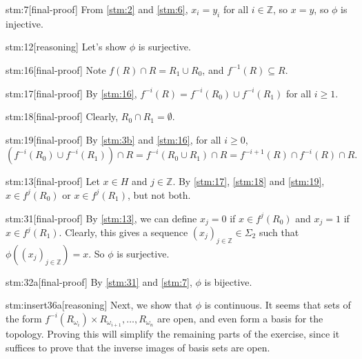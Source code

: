 \begin{stm}{stm:7}[final-proof]
From \ref{stm:2} and \ref{stm:6}, $x_i = y_i$ for all $i \in \mathbb{Z}$, so $x = y$, so $\phi$ is injective.
\end{stm}

\begin{stm}{stm:12}[reasoning]
Let's show $\phi$ is surjective.
\end{stm}

\begin{stm}{stm:16}[final-proof]
Note $f(R) \cap R = R_1 \cup R_0$, and $f^{-1}(R) \subseteq R$.
\end{stm}

\begin{stm}{stm:17}[final-proof]
By \ref{stm:16}, $f^{-i}(R) = f^{-i}(R_0) \cup f^{-i}(R_1)$ for all $i \geq 1$.
\end{stm}

\begin{stm}{stm:18}[final-proof]
Clearly, $R_0 \cap R_1 = \emptyset$.
\end{stm}

\begin{stm}{stm:19}[final-proof]
By \ref{stm:3b} and \ref{stm:16}, for all $i \ge 0$,
\[
\left(f^{-i}(R_0) \cup f^{-i}(R_1)\right) \cap R = f^{-i}(R_0 \cup R_1) \cap R = f^{-i+1}(R) \cap f^{-i}(R) \cap R.
\]
\end{stm}

\begin{stm}{stm:13}[final-proof]
Let $x \in H$ and $j \in \mathbb{Z}$. By \ref{stm:17}, \ref{stm:18} and \ref{stm:19}, $x \in f^j(R_0)$ or $x \in f^j(R_1)$, but not both.
\end{stm}

\begin{stm}{stm:31}[final-proof]
By \ref{stm:13}, we can define $x_j = 0$ if $x \in f^j(R_0)$ and $x_j = 1$ if $x \in f^j(R_1)$.  Clearly, this gives a sequence $(x_j)_{j \in \mathbb{Z}} \in \Sigma_2$ such that $\phi((x_j)_{j \in \mathbb{Z}}) = x$.
So $\phi$ is surjective.
\end{stm}

\begin{stm}{stm:32a}[final-proof]
By \ref{stm:31} and \ref{stm:7}, $\phi$ is bijective.
\end{stm}

\begin{stm}{stm:insert36a}[reasoning]
Next, we show that $\phi$ is continuous. It seems that sets of the form $f^{-i}(R_{\omega_i}) \times R_{\omega_{i+1}}, \ldots, R_{\omega_n}$ are open, and even form a basis for the topology. Proving this will simplify the remaining parts of the exercise, since it suffices to prove that the inverse images of basis sets are open.
\end{stm}

